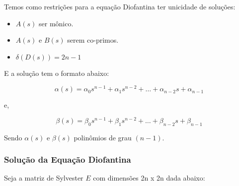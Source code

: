\documentclass[conference,harvard,brazil,english]{sbatex}
\begin{document}
            Temos como restrições para a equação Diofantina ter unicidade de soluções:
            
            \begin{itemize}
            
                \item $A(s)$ ser mônico.
                
                \item $A(s)$ e $B(s)$ serem co-primos.
                
                \item $\delta (D(s)) = 2n-1$
                
            \end{itemize}
            
            E a solução tem o formato abaixo:
            
            \begin{equation}
                \label{equ:alphas}
                \alpha(s) = \alpha_0s^{n-1} + \alpha_1s^{n-2} + \dots + \alpha_{n-2}s + \alpha_{n-1}
            \end{equation}
            
            e,
            
            \begin{equation}
                \label{equ:betas}
                \beta(s) = \beta_0s^{n-1} + \beta_1s^{n-2} + \dots + \beta_{n-2}s + \beta_{n-1}
            \end{equation}
            
            Sendo $\alpha(s)$ e $\beta(s)$ polinômios de grau $(n-1)$.
            
        \subsubsection{Solução da Equação Diofantina}
            
            Seja a matriz de Sylvester $E$ com dimensões 2n x 2n dada abaixo:
            
\end{document}
